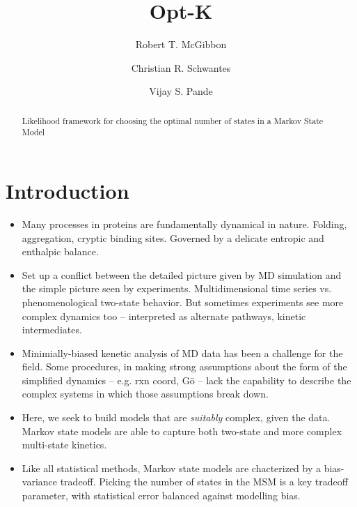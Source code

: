 \documentclass[twocolumn,floatfix,nofootinbib,aps]{revtex4-1}
\begin{document}
\title{Opt-K}
\author{Robert T. McGibbon}
\author{Christian R. Schwantes}
\author{Vijay S. Pande}

\begin{abstract}
Likelihood framework for choosing the optimal number of states in a
Markov State Model
\end{abstract}

\maketitle


\section{Introduction}
\begin{itemize}
\item Many processes in proteins are fundamentally dynamical in nature. Folding, aggregation, cryptic binding sites. Governed by a delicate entropic and enthalpic balance.
\item Set up a conflict between the detailed picture given by MD simulation and the simple picture seen by experiments. Multidimensional time series vs. phenomenological two-state behavior. But sometimes experiments see more complex dynamics too -- interpreted as alternate pathways, kinetic intermediates.
\item Minimially-biased kenetic analysis of MD data has been a challenge for the field. Some procedures, in making strong assumptions about the form of the simplified dynamics -- e.g. rxn coord, G\={o} -- lack the capability to describe the complex systems in which those assumptions break down.
\item Here, we seek to build models that are \emph{suitably} complex, given the data. Markov state models are able to capture both two-state and more complex multi-state kinetics.
\item Like all statistical methods, Markov state models are chacterized by a bias-variance tradeoff. Picking the number of states in the MSM is a key tradeoff parameter, with statistical error balanced against modelling bias.
\end{itemize}
\end{document}
